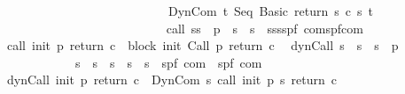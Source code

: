 \begin{isabellebody}
\ \ \ \ \ \ \ \ \ \ \ \ \ \ \ \ \ \ \ \ \ \ \ \ \ \ \ \ {\isacharparenleft}DynCom\ {\isacharparenleft}{\isasymlambda}t{\isachardot}\ Seq\ {\isacharparenleft}Basic\ {\isacharparenleft}return\ s{\isacharparenright}{\isacharparenright}\ {\isacharparenleft}c\ s\ t{\isacharparenright}{\isacharparenright}{\isacharparenright}{\isacharparenright}\isanewline
\ \ \ \ \ \ \ \ \ \ \ \ \ \ \ \ \ \ \ \ \ \ \ \ {\isacharparenright}{\isachardoublequoteclose}\ \isanewline
\isanewline
{}\isamarkupfalse%
\isanewline
\ \ call{\isacharcolon}{\isacharcolon}\ {\isachardoublequoteopen}{\isacharparenleft}{\isacharprime}s{\isasymRightarrow}{\isacharprime}s{\isacharparenright}\ {\isasymRightarrow}\ {\isacharprime}p\ {\isasymRightarrow}\ {\isacharparenleft}{\isacharprime}s\ {\isasymRightarrow}\ {\isacharprime}s\ {\isasymRightarrow}\ {\isacharprime}s{\isacharparenright}{\isasymRightarrow}{\isacharparenleft}{\isacharprime}s{\isasymRightarrow}{\isacharprime}s{\isasymRightarrow}{\isacharparenleft}{\isacharprime}s{\isacharcomma}{\isacharprime}p{\isacharcomma}{\isacharprime}f{\isacharparenright}\ com{\isacharparenright}{\isasymRightarrow}{\isacharparenleft}{\isacharprime}s{\isacharcomma}{\isacharprime}p{\isacharcomma}{\isacharprime}f{\isacharparenright}com{\isachardoublequoteclose}\ \isanewline
\ \ {\isachardoublequoteopen}call\ init\ p\ return\ c\ {\isacharequal}\ block\ init\ {\isacharparenleft}Call\ p{\isacharparenright}\ return\ c{\isachardoublequoteclose}\isanewline
\isanewline
{}\isamarkupfalse%
\isanewline
\ \ dynCall{\isacharcolon}{\isacharcolon}\ {\isachardoublequoteopen}{\isacharparenleft}{\isacharprime}s\ {\isasymRightarrow}\ {\isacharprime}s{\isacharparenright}\ {\isasymRightarrow}\ {\isacharparenleft}{\isacharprime}s\ {\isasymRightarrow}\ {\isacharprime}p{\isacharparenright}\ {\isasymRightarrow}\ \isanewline
\ \ \ \ \ \ \ \ \ \ \ \ \ {\isacharparenleft}{\isacharprime}s\ {\isasymRightarrow}\ {\isacharprime}s\ {\isasymRightarrow}\ {\isacharprime}s{\isacharparenright}\ {\isasymRightarrow}\ {\isacharparenleft}{\isacharprime}s\ {\isasymRightarrow}\ {\isacharprime}s\ {\isasymRightarrow}\ {\isacharparenleft}{\isacharprime}s{\isacharcomma}{\isacharprime}p{\isacharcomma}{\isacharprime}f{\isacharparenright}\ com{\isacharparenright}\ {\isasymRightarrow}\ {\isacharparenleft}{\isacharprime}s{\isacharcomma}{\isacharprime}p{\isacharcomma}{\isacharprime}f{\isacharparenright}\ com{\isachardoublequoteclose}\ \isanewline
\ \ {\isachardoublequoteopen}dynCall\ init\ p\ return\ c\ {\isacharequal}\ DynCom\ {\isacharparenleft}{\isasymlambda}s{\isachardot}\ call\ init\ {\isacharparenleft}p\ s{\isacharparenright}\ return\ c{\isacharparenright}{\isachardoublequoteclose}\isanewline

\end{isabellebody}
